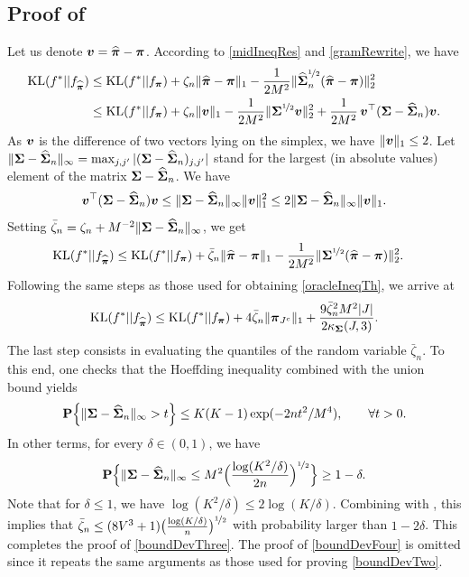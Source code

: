 \subsection{Proof of }
\label{ssec:proof:smallK}
Let us denote $\boldsymbol v = \widehat{\boldsymbol \pi} - \boldsymbol \pi$. According to \eqref{midIneqRes} and \eqref{gramRewrite},
we have
\begin{align}
{\rm KL}(f^*|| f_{\widehat{\boldsymbol \pi}})
&\leq {\rm KL}(f^*|| f_{\boldsymbol \pi})+ \zeta_n\|\widehat{\boldsymbol \pi} - \boldsymbol \pi \|_1-
\frac{1}{2M^2}\|\widehat{\boldsymbol\Sigma}_n^{\nicefrac12}(\widehat{\boldsymbol \pi}-\boldsymbol \pi)\|_2^2\\
&\leq {\rm KL}(f^*|| f_{\boldsymbol \pi})+ \zeta_n\|\boldsymbol v\|_1-\frac{1}{2M^2}\|\boldsymbol\Sigma^{\nicefrac12}\boldsymbol v\|_2^2+
\frac{1}{2M^2}\,\boldsymbol v^\top(\boldsymbol\Sigma-\widehat{\boldsymbol\Sigma}_n)\boldsymbol v.
\label{midIneqResTwo}
\end{align}
As $\boldsymbol v$ is the difference of two vectors lying on the simplex, we have $\|\boldsymbol v\|_1\le 2$. Let
$\|\boldsymbol\Sigma-\widehat{\boldsymbol\Sigma}_n\|_\infty = \max_{j,j'}|(\boldsymbol\Sigma-\widehat{\boldsymbol\Sigma}_n)_{j,j'}|$ stand for the
largest (in absolute values) element of the matrix $\boldsymbol\Sigma-\widehat{\boldsymbol\Sigma}_n$. We have
\begin{equation}
\boldsymbol v^\top(\boldsymbol\Sigma-\widehat{\boldsymbol\Sigma}_n)\boldsymbol v \le \|\boldsymbol\Sigma-\widehat{\boldsymbol\Sigma}_n\|_{\infty} \|\boldsymbol v\|_1^2
\le 2\|\boldsymbol\Sigma-\widehat{\boldsymbol\Sigma}_n\|_{\infty} \|\boldsymbol v\|_1.
\end{equation}
Setting $\bar\zeta_n = \zeta_n + M^{-2}\|\boldsymbol\Sigma-\widehat{\boldsymbol\Sigma}_n\|_{\infty}$, we get
\begin{align}
{\rm KL}(f^*|| f_{\widehat{\boldsymbol \pi}})
&\leq {\rm KL}(f^*|| f_{\boldsymbol \pi})+ \bar\zeta_n\|\widehat{\boldsymbol \pi} - \boldsymbol \pi \|_1-
\frac{1}{2M^2}\|\boldsymbol\Sigma^{\nicefrac12}(\widehat{\boldsymbol \pi}-\boldsymbol \pi)\|_2^2.
\label{midIneqResThree}
\end{align}
Following the same steps as those used for obtaining \eqref{oracleIneqTh}, we arrive at
\begin{equation}
\label{oracleIneqThTwo}
{\rm KL}(f^*|| f_{\widehat{\boldsymbol \pi}}) \leq {\rm KL}(f^*|| f_{\boldsymbol \pi}) + 4\bar\zeta_n\| \boldsymbol \pi_{J^c}\|_1 +
\frac{9\bar\zeta_n^2M^2|J|}{2\kappa_{\boldsymbol\Sigma}(J,3)}.
\end{equation}
The last step consists in evaluating the quantiles of the random variable $\bar\zeta_n$.
To this end, one checks that the Hoeffding inequality combined with the union bound yields
\begin{equation}
\mathbf P\Big\{\|\boldsymbol\Sigma-\widehat{\boldsymbol\Sigma}_n\|_{\infty} >t\Big\} \le K(K-1) \exp({-2nt^2/M^4}),\qquad\forall t>0.
\end{equation}
In other terms, for every $\delta\in(0,1)$, we have
\begin{equation}
\mathbf P\Big\{\|\boldsymbol\Sigma-\widehat{\boldsymbol\Sigma}_n\|_{\infty} \le M^2\Big(\frac{\log(K^2/\delta)}{2n}\Big)^{\nicefrac12} \Big\}
\ge 1-\delta.\label{SigmaInfty}
\end{equation}
Note that for $\delta\le 1$, we have $\log(K^2/\delta)\le 2\log(K/\delta)$. Combining with
, this implies that $\bar\zeta_n \le (8V^3+1)\big(\frac{\log(K/\delta)}{n}
\big)^{\nicefrac12}$ with probability larger than $1-2\delta$. This completes the proof of \eqref{boundDevThree}.
The proof of \eqref{boundDevFour} is omitted since it repeats the same arguments as those
used for proving \eqref{boundDevTwo}.


